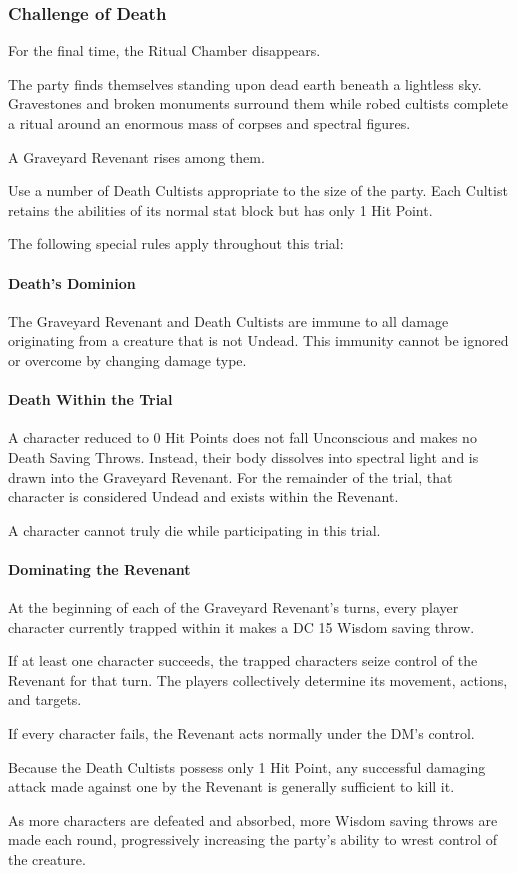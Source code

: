 \subsubsection*{Challenge of Death}
{\entryfont For the final time, the Ritual Chamber disappears.

The party finds themselves standing upon dead earth beneath a lightless sky. Gravestones and broken monuments surround them while robed cultists complete a ritual around an enormous mass of corpses and spectral figures.

A Graveyard Revenant rises among them.

Use a number of Death Cultists appropriate to the size of the party. Each Cultist retains the abilities of its normal stat block but has only 1 Hit Point.

The following special rules apply throughout this trial:

\paragraph*{Death's Dominion} The Graveyard Revenant and Death Cultists are immune to all damage originating from a creature that is not Undead. This immunity cannot be ignored or overcome by changing damage type.

\paragraph*{Death Within the Trial} A character reduced to 0 Hit Points does not fall Unconscious and makes no Death Saving Throws. Instead, their body dissolves into spectral light and is drawn into the Graveyard Revenant. For the remainder of the trial, that character is considered Undead and exists within the Revenant.

A character cannot truly die while participating in this trial.

\paragraph*{Dominating the Revenant} At the beginning of each of the Graveyard Revenant's turns, every player character currently trapped within it makes a DC 15 Wisdom saving throw.

If at least one character succeeds, the trapped characters seize control of the Revenant for that turn. The players collectively determine its movement, actions, and targets.

If every character fails, the Revenant acts normally under the DM's control.

Because the Death Cultists possess only 1 Hit Point, any successful damaging attack made against one by the Revenant is generally sufficient to kill it.

As more characters are defeated and absorbed, more Wisdom saving throws are made each round, progressively increasing the party's ability to wrest control of the creature.}

